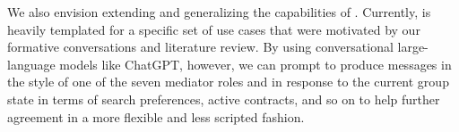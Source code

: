 We also envision extending and generalizing the capabilities of \cbot. Currently, \cbot is heavily templated for a specific set of use cases that were motivated by our formative conversations and literature review. By using conversational large-language models like ChatGPT, however, we can prompt \cbot to produce messages in the style of one of the seven mediator roles and in response to the current group state in terms of search preferences, active contracts, and so on to help further agreement in a more flexible and less scripted fashion.  
